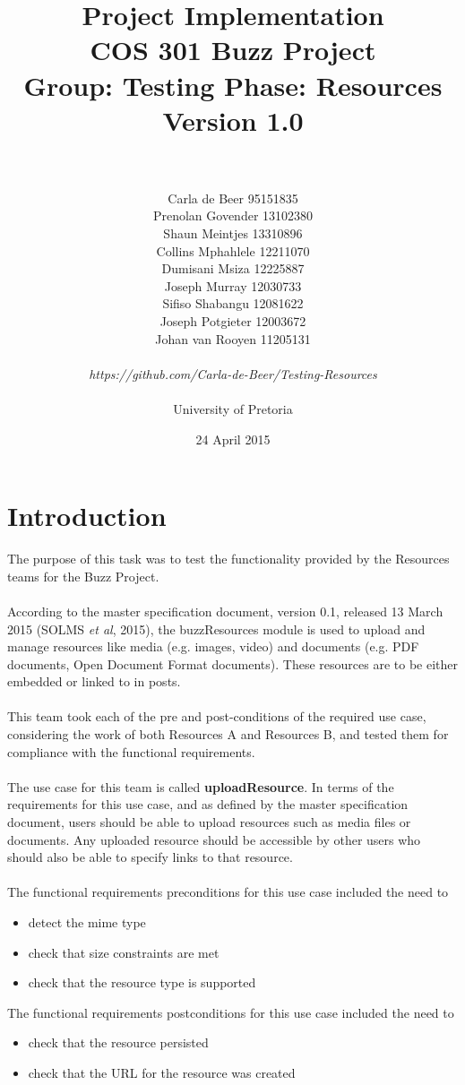 \documentclass[a4paper]{article}
\title{Project Implementation
\\COS 301 Buzz Project
\\Group: Testing Phase: Resources
\\Version 1.0}
\author{
\\
\\Carla de Beer 95151835
\\Prenolan Govender 13102380
\\Shaun Meintjes 13310896
\\Collins Mphahlele 12211070
\\Dumisani Msiza 12225887
\\Joseph Murray 12030733
\\Sifiso Shabangu 12081622
\\Joseph Potgieter 12003672
\\Johan van Rooyen 11205131
\\
\\
\textit{https://github.com/Carla-de-Beer/Testing-Resources}
\\
\\ University of Pretoria}
\date{24 April 2015}
\begin{document}
\maketitle
\newpage


\tableofcontents
\newpage

\section{Introduction}

The purpose of this task was to test the functionality provided by the Resources teams for the Buzz Project.
\\
\\
According to the master specification document, version 0.1, released 13 March 2015 (SOLMS \textit{et al}, 2015), the buzzResources module is used to upload and manage resources like media (e.g. images, video) and documents (e.g. PDF documents, Open Document Format documents). These resources are to be either embedded or linked to in posts.
\\
\\
This team took each of the pre and post-conditions of the required use case, considering the work of both Resources A and Resources B, and tested them for compliance with the functional requirements. 
\\
\\The use case for this team is called \textbf{uploadResource}. In terms of the requirements for this use case, and as defined by the master specification document, users should be able to upload resources such as media files or documents. Any uploaded resource should be accessible by other users who should also be able to specify links to that resource. 
\\
\\The functional requirements preconditions for this use case included the need to
\begin{itemize}
\item detect the mime type
\item check that size constraints are met
\item check that the resource type is supported
\end{itemize}
The functional requirements postconditions for this use case included the need to
\begin{itemize}
\item check that the resource persisted
\item check that the URL for the resource was created
\end{itemize}
\end{document}
